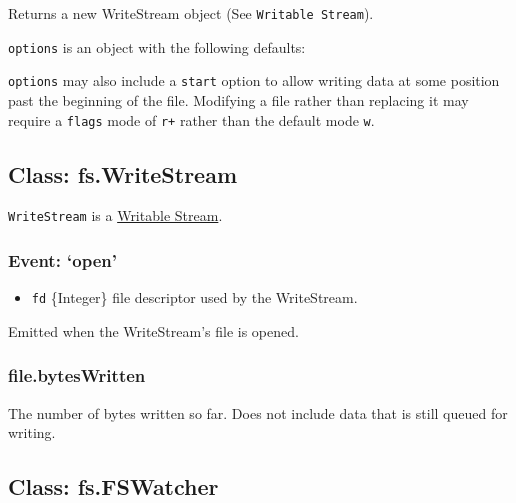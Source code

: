 Returns a new WriteStream object (See \texttt{Writable Stream}).

\texttt{options} is an object with the following defaults:

\begin{Shaded}
\begin{Highlighting}[]
\NormalTok{\{ }\NormalTok{: }\NormalTok{,}
  \NormalTok{: }\NormalTok{,}
  \NormalTok{: } \NormalTok{\}}
\end{Highlighting}
\end{Shaded}

\texttt{options} may also include a \texttt{start} option to allow
writing data at some position past the beginning of the file. Modifying
a file rather than replacing it may require a \texttt{flags} mode of
\texttt{r+} rather than the default mode \texttt{w}.

\subsection{Class: fs.WriteStream}\label{class-fs.writestream}

\texttt{WriteStream} is a
\href{stream.html\#stream_class_stream_writable}{Writable Stream}.

\subsubsection{Event: `open'}\label{event-open-1}

\begin{itemize}
\itemsep1pt\parskip0pt
\item
  \texttt{fd} \{Integer\} file descriptor used by the WriteStream.
\end{itemize}

Emitted when the WriteStream's file is opened.

\subsubsection{file.bytesWritten}\label{file.byteswritten}

The number of bytes written so far. Does not include data that is still
queued for writing.

\subsection{Class: fs.FSWatcher}\label{class-fs.fswatcher}

